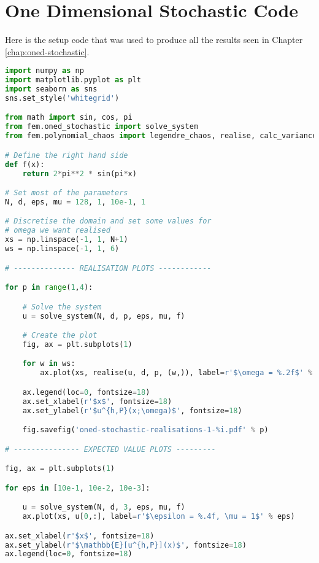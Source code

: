 \chapter{One Dimensional Stochastic Code}\label{app:oned-stochastic-code}

Here is the setup code that was used to produce all the results seen in Chapter
\ref{chap:oned-stochastic}.
\begin{lstlisting}[language=Python,
                   caption={Setup code used to obtain results for Chapter
                   \ref{chap:oned-stochastic}},
                   label={code:oned-stochastic-setup}]
import numpy as np
import matplotlib.pyplot as plt
import seaborn as sns
sns.set_style('whitegrid')

from math import sin, cos, pi
from fem.oned_stochastic import solve_system
from fem.polynomial_chaos import legendre_chaos, realise, calc_variance

# Define the right hand side
def f(x):
    return 2*pi**2 * sin(pi*x)

# Set most of the parameters
N, d, eps, mu = 128, 1, 10e-1, 1

# Discretise the domain and set some values for
# omega we want realised
xs = np.linspace(-1, 1, N+1)
ws = np.linspace(-1, 1, 6)

# -------------- REALISATION PLOTS ------------

for p in range(1,4):

    # Solve the system
    u = solve_system(N, d, p, eps, mu, f)

    # Create the plot
    fig, ax = plt.subplots(1)

    for w in ws:
        ax.plot(xs, realise(u, d, p, (w,)), label=r'$\omega = %.2f$' % w)

    ax.legend(loc=0, fontsize=18)
    ax.set_xlabel(r'$x$', fontsize=18)
    ax.set_ylabel(r'$u^{h,P}(x;\omega)$', fontsize=18)

    fig.savefig('oned-stochastic-realisations-1-%i.pdf' % p)

# --------------- EXPECTED VALUE PLOTS ---------

fig, ax = plt.subplots(1)

for eps in [10e-1, 10e-2, 10e-3]:

    u = solve_system(N, d, 3, eps, mu, f)
    ax.plot(xs, u[0,:], label=r'$\epsilon = %.4f, \mu = 1$' % eps)

ax.set_xlabel(r'$x$', fontsize=18)
ax.set_ylabel(r'$\mathbb{E}[u^{h,P}](x)$', fontsize=18)
ax.legend(loc=0, fontsize=18)


\end{lstlisting}
